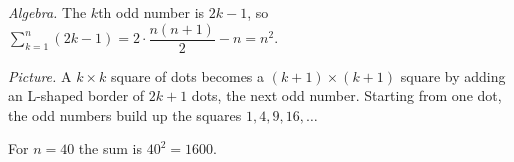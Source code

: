 \emph{Algebra.} The $k$th odd number is $2k-1$, so $\sum_{k=1}^n(2k-1)=2\cdot\dfrac{n(n+1)}{2}-n=n^2$.

\emph{Picture.} A $k\times k$ square of dots becomes a $(k+1)\times(k+1)$ square by adding an L-shaped border of $2k+1$ dots, the next odd number. Starting from one dot, the odd numbers build up the squares $1,4,9,16,\dots$

For $n=40$ the sum is $40^2=\boxed{1600}$.
